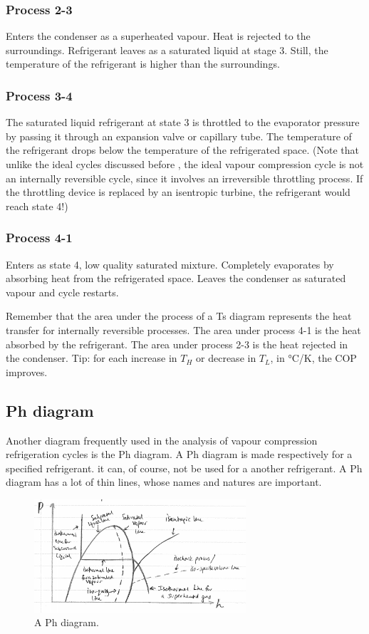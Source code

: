 \documentclass[class=report, crop=false, 12pt,a4paper]{standalone}
\begin{document}
\subsubsection{Process 2-3}
Enters the condenser as a superheated vapour. Heat is rejected to the surroundings. Refrigerant leaves as a saturated liquid at stage 3. Still, the temperature of the refrigerant is higher than the surroundings. 
\subsubsection{Process 3-4}
The saturated liquid refrigerant at state 3 is throttled to the evaporator pressure by passing it through an expansion valve or capillary tube. The temperature of the refrigerant drops below the temperature of the refrigerated space. (Note that unlike the ideal cycles discussed before , the ideal vapour compression cycle is not an internally reversible cycle, since it involves an irreversible throttling process. If the throttling device is replaced by an isentropic turbine, the refrigerant would reach state 4!)
\subsubsection{Process 4-1}
Enters as state 4, low quality saturated mixture. Completely evaporates by absorbing heat from the refrigerated space. Leaves the condenser as saturated vapour and cycle restarts.

Remember that the area under the process of a Ts diagram represents the heat transfer for internally reversible processes. The area under process 4-1 is the heat absorbed by the refrigerant. The area under process 2-3 is the heat rejected in the condenser. Tip: for each increase in $T_H$ or decrease in $T_L$, in \si{\celsius}/\si{\kelvin}, the COP improves.
\subsection{Ph diagram}
Another diagram frequently used in the analysis of vapour compression refrigeration cycles is the Ph diagram. A Ph diagram is made respectively for a specified refrigerant. it can, of course, not be used for a another refrigerant. A Ph diagram has a lot of thin lines, whose names and natures are important. 
\begin{figure}
  \centering
  \includegraphics[width = 0.7\textwidth]{../img/PhDiagram}
  \caption{A Ph diagram.}
\end{figure}
\end{document}

